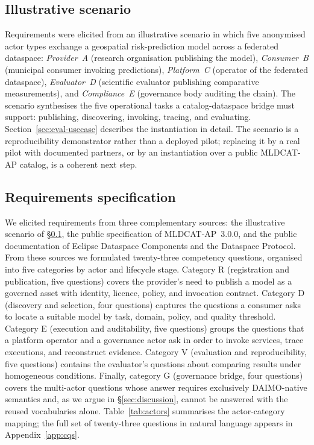 \documentclass[Afour,sagev,times]{sagej}
\begin{document}
\subsection{Illustrative scenario}\label{sec:scenario}

Requirements were elicited from an illustrative scenario in which five anonymised actor types exchange a geospatial risk-prediction model across a federated dataspace: \emph{Provider~A} (research organisation publishing the model), \emph{Consumer~B} (municipal consumer invoking predictions), \emph{Platform~C} (operator of the federated dataspace), \emph{Evaluator~D} (scientific evaluator publishing comparative measurements), and \emph{Compliance~E} (governance body auditing the chain). The scenario synthesises the five operational tasks a catalog-dataspace bridge must support: publishing, discovering, invoking, tracing, and evaluating. Section~\ref{sec:eval-usecase} describes the instantiation in detail. The scenario is a reproducibility demonstrator rather than a deployed pilot; replacing it by a real pilot with documented partners, or by an instantiation over a public MLDCAT-AP catalog, is a coherent next step.

\subsection{Requirements specification}\label{sec:method-req}

We elicited requirements from three complementary sources: the illustrative scenario of §\ref{sec:scenario}, the public specification of MLDCAT-AP~3.0.0, and the public documentation of Eclipse Dataspace Components and the Dataspace Protocol. From these sources we formulated twenty-three competency questions, organised into five categories by actor and lifecycle stage. Category R (registration and publication, five questions) covers the provider's need to publish a model as a governed asset with identity, licence, policy, and invocation contract. Category D (discovery and selection, four questions) captures the questions a consumer asks to locate a suitable model by task, domain, policy, and quality threshold. Category E (execution and auditability, five questions) groups the questions that a platform operator and a governance actor ask in order to invoke services, trace executions, and reconstruct evidence. Category V (evaluation and reproducibility, five questions) contains the evaluator's questions about comparing results under homogeneous conditions. Finally, category G (governance bridge, four questions) covers the multi-actor questions whose answer requires exclusively DAIMO-native semantics and, as we argue in §\ref{sec:discussion}, cannot be answered with the reused vocabularies alone. Table~\ref{tab:actors} summarises the actor-category mapping; the full set of twenty-three questions in natural language appears in Appendix~\ref{app:cqs}.
\end{document}
